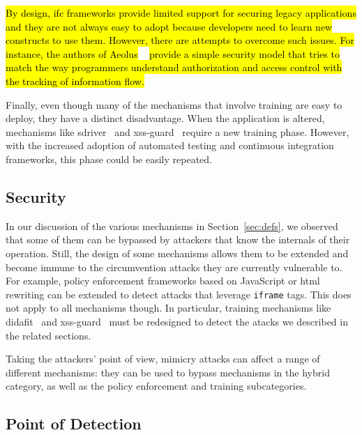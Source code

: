 \documentclass[10pt,journal,compsoc]{IEEEtran}
\newcommand{\hlc}[2][yellow]{ {\sethlcolor{#1} \hl{#2}} }
\begin{document}
\hlc[yellow]{
By design,
{\sc ifc} frameworks provide
limited support for securing legacy applications
and they are not always easy to adopt
because developers need to learn new constructs
to use them.
However,
there are attempts to overcome such issues.
For instance,
the authors of
Aeolus}~\cite{CPSPBCCSL12}
\hlc[yellow]{provide a simple security model
that tries to match the way programmers understand
authorization and access control
with the tracking of information flow.}

Finally, even though many of the mechanisms that involve
training are easy to deploy, they have a distinct disadvantage.
When the application is altered, mechanisms like
{\sc sd}river~\cite{MS09}
and {\sc xss-guard}~\cite{BV08} require a new training phase.
However, with the increased adoption of automated testing
and continuous integration frameworks, this phase could be
easily repeated.

\vspace{-0.3mm}
\subsection{Security}
\vspace{-0.5mm}

In our discussion of the various mechanisms in Section~\ref{sec:defs}, we
observed that some of them can be bypassed by attackers that know
the internals of their operation.
Still, the design of some mechanisms allows them to
be extended and become immune to the circumvention attacks they are
currently vulnerable to. For example, policy enforcement frameworks
based on JavaScript or {\sc html} rewriting can be extended
to detect attacks that leverage {\tt iframe} tags. This does not apply
to all mechanisms though. In particular, training mechanisms like {\sc
  didafit}~\cite{LLW02} and {\sc xss-guard}~\cite{BV08} must be
redesigned to detect the atacks we described in the related sections.

Taking the attackers' point of view, mimicry attacks can affect a
range of different mechanisms: they can be used to bypass mechanisms
in the hybrid category, as well as the policy enforcement and training
subcategories.

\vspace{-0.3mm}
\subsection{Point of Detection}
\vspace{-0.5mm}
\end{document}

